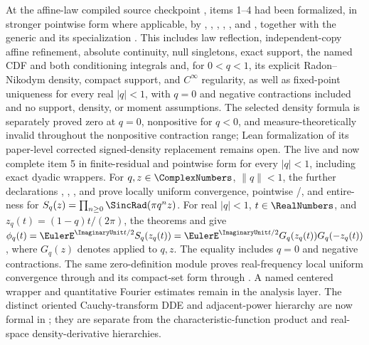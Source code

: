 \documentclass[11pt]{article}
\numberwithin{equation}{section}
\theoremstyle{definition}
\theoremstyle{remark}
\begin{document}
At the affine-law compiled source checkpoint , items 1--4 had been formalized, in
stronger pointwise form where applicable, by ,
, ,
, , and
, together with the generic
 and its specialization
.  This includes law reflection, independent-copy affine
refinement, absolute continuity, null singletons, exact support, the named CDF and both
conditioning integrals and, for \(0<q<1\), its explicit Radon--Nikodym density, compact
support, and \(C^\infty\) regularity, as well as fixed-point uniqueness for every real
\(|q|<1\), with \(q=0\) and negative contractions included and no support, density, or
moment assumptions.  The selected density formula is separately proved zero at \(q=0\),
nonpositive for \(q<0\), and measure-theoretically invalid throughout the nonpositive
contraction range; Lean formalization of its paper-level corrected signed-density replacement
remains open.
The live  and
 now complete item 5 in finite-residual and pointwise
 form for every \(|q|<1\), including exact dyadic wrappers.  For
\(q,z\in\ComplexNumbers\), \(\lVert q\rVert<1\), the further declarations
,
,
, and
 prove locally uniform convergence, pointwise
/, and entire-ness for
\(S_q(z)=\prod_{n\ge0}\SincRad(\pi q^nz)\).  For real \(|q|<1\), \(t\in\RealNumbers\), and
\(z_q(t)=(1-q)t/(2\pi)\), the theorems
 and
 give
\(\phi_q(t)=\EulerE^{\ImaginaryUnit t/2}S_q(z_q(t))
=\EulerE^{\ImaginaryUnit t/2}G_q(z_q(t))G_q(-z_q(t))\), where \(G_q(z)\) denotes
 applied to \(q,z\).  The equality includes \(q=0\) and
negative contractions.
The same zero-definition module proves real-frequency local uniform convergence through
 and its compact-set form through
.  A named centered wrapper and quantitative
Fourier estimates remain in the analysis layer.
The distinct oriented Cauchy-transform DDE and adjacent-power hierarchy are now formal in
; they are separate from the characteristic-function
product and real-space density-derivative hierarchies.
\end{document}
